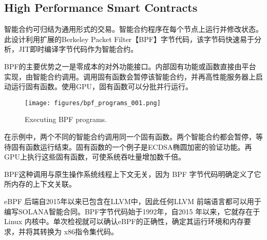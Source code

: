 \documentclass[12pt, uft8]{ctexart}
\begin{document}
\subsection{High Performance Smart Contracts}\label{sec:smartcontracts}

智能合约可归结为通用形式的交易。智能合约程序在每个节点上运行并修改状态。此设计利用扩展的Berkeley Packet Filter【BPF】字节代码，该字节码快速易于分析，JIT即时编译字节代码作为智能合约。

BPF的主要优势之一是零成本的对外功能接口。内部固有功能或函数直接由平台实现，由智能合约调用。调用固有函数会暂停该智能合约，并再高性能服务器上启动运行固有函数。使用GPU，固有函数可以分批并行运行。

\begin{figure}
  \begin{center}
    \centering
    \texttt{[image: figures/bpf\_programs\_001.png]}
    \caption[Fig 11]{Executing  BPF programs.\label{fig_11}}
  \end{center}
  \end{figure}

在示例中，两个不同的智能合约调用同一个固有函数。两个智能合约都会暂停，等待固有函数运行结束。固有函数的一个例子是ECDSA椭圆加密的验证功能。再 GPU上执行这些固有函数，可使系统吞吐量增加数千倍。

BPF这种调用与原生操作系统线程上下文无关，因为 BPF 字节代码明确定义了它所内存的上下文关联。

eBPF 后端自2015年以来已包含在LLVM中，因此任何LLVM 前端语言都可以用于编写SOLANA智能合同。BPF字节代码始于1992年，自2015 年以来，它就存在于Linux 内核中。单次检视就可以确认eBPF的正确性，确定其运行环境和内存要求，并将其转换为 x86指令集代码。



\end{document}
